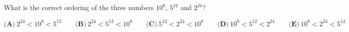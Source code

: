 What is the correct ordering of the three numbers $10^8$, $5^{12}$ and $2^{24}$?

$\textbf{(A)}\ 2^{24}<10^8<5^{12}\qquad\textbf{(B)}\ 2^{24}<5^{12}<10^8\qquad\textbf{(C)}\ 5^{12}<2^{24}<10^8\qquad\textbf{(D)}\ 10^8<5^{12}<2^{24}\qquad\textbf{(E)}\ 10^8<2^{24}<5^{12}$
